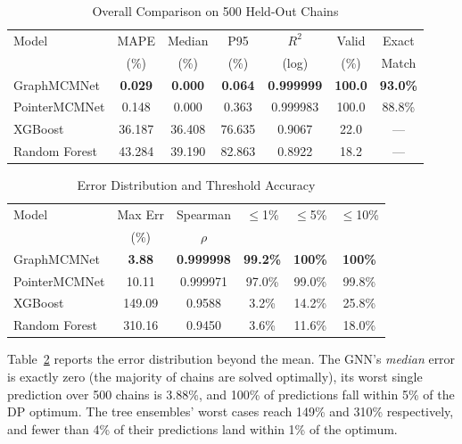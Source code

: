 \documentclass[conference]{IEEEtran}
\begin{document}
\begin{table}[t]
\caption{Overall Comparison on 500 Held-Out Chains}
\label{tab:overall}
\centering
\setlength{\tabcolsep}{3.5pt}
\begin{tabular}{lcccccc}
\toprule
Model & MAPE & Median & P95 & $R^2$ & Valid & Exact \\
      & (\%) & (\%)   & (\%) & (log) & (\%) & Match \\
\midrule
GraphMCMNet   & \textbf{0.029} & \textbf{0.000} & \textbf{0.064} & \textbf{0.999999} & \textbf{100.0} & \textbf{93.0\%} \\
PointerMCMNet & 0.148 & 0.000 & 0.363 & 0.999983 & 100.0 & 88.8\% \\
XGBoost       & 36.187 & 36.408 & 76.635 & 0.9067 & 22.0 & --- \\
Random Forest & 43.284 & 39.190 & 82.863 & 0.8922 & 18.2 & --- \\
\bottomrule
\end{tabular}
\end{table}

\begin{table}[t]
\caption{Error Distribution and Threshold Accuracy}
\label{tab:thresholds}
\centering
\setlength{\tabcolsep}{3.5pt}
\begin{tabular}{lccccc}
\toprule
Model & Max Err & Spearman & $\le$1\% & $\le$5\% & $\le$10\% \\
      & (\%)    & $\rho$   &          &          &           \\
\midrule
GraphMCMNet   & \textbf{3.88} & \textbf{0.999998} & \textbf{99.2\%} & \textbf{100\%} & \textbf{100\%} \\
PointerMCMNet & 10.11 & 0.999971 & 97.0\% & 99.0\% & 99.8\% \\
XGBoost       & 149.09 & 0.9588 & 3.2\% & 14.2\% & 25.8\% \\
Random Forest & 310.16 & 0.9450 & 3.6\% & 11.6\% & 18.0\% \\
\bottomrule
\end{tabular}
\end{table}

Table~\ref{tab:thresholds} reports the error distribution beyond the mean. The
GNN's \emph{median} error is exactly zero (the majority of chains are solved
optimally), its worst single prediction over 500 chains is 3.88\%, and 100\%
of predictions fall within 5\% of the DP optimum. The tree ensembles' worst
cases reach 149\% and 310\% respectively, and fewer than 4\% of their
predictions land within 1\% of the optimum.
\end{document}
